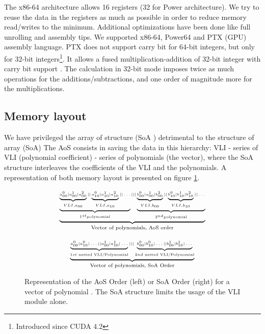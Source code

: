 \documentclass[oribibl]{llncs2e/llncs}
\begin{document}
The x86-64 architecture allows 16 registers (32 for Power architecture). We try to reuse the data in the registers as much as possible in order to reduce memory read/writes to the minimum.  Additional optimizations have been done like full unrolling and assembly tips. We  supported  x86-64, Power64 and PTX (GPU) assembly language.
 PTX does not support carry bit for 64-bit integers, but only for 32-bit integers\footnote{Introduced since CUDA 4.2}.  
It allows a fused multiplication-addition of 32-bit integer  with carry bit support \cite{CUDAasm}. 
The calculation in 32-bit mode imposes twice as much operations for the additions/subtractions, and one order of magnitude more for the multiplications. 

\subsection{Memory layout}

We have privileged the  array  of structure  (SoA ) detrimental to the  structure of array (SoA)
The AoS consists in saving the data in this hierarchy: VLI - series of VLI (polynomial coefficient) - series of polynomials (the vector), where  the SoA structure interleaves the coefficients of the VLI and the polynomials.
A representation of both memory layout is presented on figure \ref{AOSSOA}. 

\begin{figure}
    \begin{minipage}{0.50\linewidth}
        \begin{eqnarray}
        \tiny{
                 \underbrace{
                 \underbrace{ \underbrace{a^0_{00} | a^1_{00} | a^2_{00}}_{VLI, a_{00} } || \underbrace{a^0_{10} | a^1_{10} | a^2_{10}}_{VLI, a_{10}} ||   \dots  }_{1^{st} \textrm{polynomial}} 
                  |||    \underbrace{ \underbrace{b^0_{00} | a^1_{00} | b^2_{00}}_{VLI, b_{00} } || \underbrace{b^0_{10} | b^1_{10} | b^2_{10}}_{VLI, b_{10}} ||   \dots  }_{2^{nd} \textrm{polynomial} } }_{\textrm{Vector of polynomials, AoS order}} \nonumber
            }
        \end{eqnarray}
    \end{minipage}
\begin{minipage}{0.50\linewidth}
    \begin{eqnarray}
    \tiny{
        \underbrace{
        \underbrace{a^0_{00} | a^0_{10} | \dots || a^1_{00} | a^1_{10} | \dots  }_{1st  \textrm{ nested VLI/Polynomial} } |||  \underbrace{b^0_{00} | b^0_{10} | \dots || b^1_{00} | b^1_{10} | \dots  }_{2nd  \textrm{ nested VLI/Polynomial} }
        }_{\textrm{Vector of polynomials, SoA Order}} \nonumber }
        \end{eqnarray}
\end{minipage}
\caption{Representation of the AoS Order (left) or SoA Order (right) for a vector of polynomial \label{AOSSOA}.  The SoA structure limits the usage of the VLI module alone.}
\end{figure}
\end{document}
